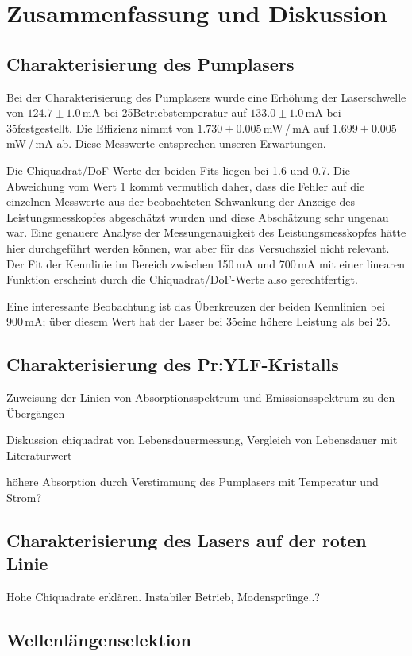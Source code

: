 \section{Zusammenfassung und Diskussion}

\subsection{Charakterisierung des Pumplasers}

Bei der Charakterisierung des Pumplasers wurde eine Erhöhung der Laserschwelle von
$124.7\pm1.0$\,mA bei 25\grad Betriebstemperatur auf $133.0\pm1.0$\,mA bei 35\grad festgestellt.
Die Effizienz nimmt von $1.730\pm0.005$\,mW\,/\,mA auf $1.699\pm0.005$\,mW\,/\,mA ab.
Diese Messwerte entsprechen unseren Erwartungen.

Die Chiquadrat/DoF-Werte der beiden Fits liegen bei 1.6 und 0.7.
Die Abweichung vom Wert 1 kommt vermutlich daher,
dass die Fehler auf die einzelnen Messwerte aus der beobachteten Schwankung der Anzeige des
Leistungsmesskopfes abgeschätzt wurden und diese Abschätzung sehr ungenau war.
Eine genauere Analyse der Messungenauigkeit des Leistungsmesskopfes hätte hier durchgeführt werden
können, war aber für das Versuchsziel nicht relevant.
Der Fit der Kennlinie im Bereich zwischen 150\,mA und 700\,mA mit einer linearen Funktion erscheint
durch die Chiquadrat/DoF-Werte also gerechtfertigt.

Eine interessante Beobachtung ist das Überkreuzen der beiden Kennlinien bei 900\,mA;
über diesem Wert hat der Laser bei 35\grad eine höhere Leistung als bei 25\grad.

\subsection{Charakterisierung des Pr:YLF-Kristalls}

Zuweisung der Linien von Absorptionsspektrum und Emissionsspektrum zu den Übergängen 

Diskussion chiquadrat von Lebensdauermessung, Vergleich von Lebensdauer mit Literaturwert

höhere Absorption durch Verstimmung des Pumplasers mit Temperatur und Strom?

\subsection{Charakterisierung des Lasers auf der roten Linie}
Hohe Chiquadrate erklären. Instabiler Betrieb, Modensprünge..?


\subsection{Wellenlängenselektion}